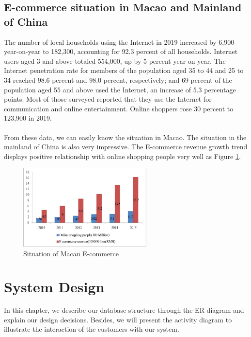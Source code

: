 \documentclass{article}
\begin{document}
\subsection{E-commerce situation in Macao and Mainland of China}
The number of local households using the Internet in 2019 increased by 6,900 year-on-year to 182,300, accounting for 92.3 percent of all households.  Internet users aged 3 and above totaled 554,000, up by 5 percent year-on-year. The Internet penetration rate for members of the population aged 35 to 44 and 25 to 34 reached 98.6 percent and 98.0 percent, respectively; and 69 percent of the population aged 55 and above used the Internet, an increase of 5.3 percentage points. Most of those surveyed reported that they use the Internet for communication and online entertainment. Online shoppers rose 30 percent to 123,900 in 2019.
\\\\
From these data, we can easily know the situation in Macao. The situation in the mainland of China is also very impressive. The E-commerce revenue growth trend displays positive relationship with online shopping people very well as Figure \ref{fig:Macau E-commerce}.
\begin{figure}[!htp]
    \centering
    \includegraphics[width=0.6\textwidth]{Macau E-commerce.png}
    \caption{\label{fig:Macau E-commerce}Situation of Macau E-commerce}
\end{figure}

\section{System Design}

In this chapter, we describe our database structure through the ER diagram and explain our design decisions. Besides, we will present the activity diagram to illustrate the interaction of the customers with our system.
\end{document}
